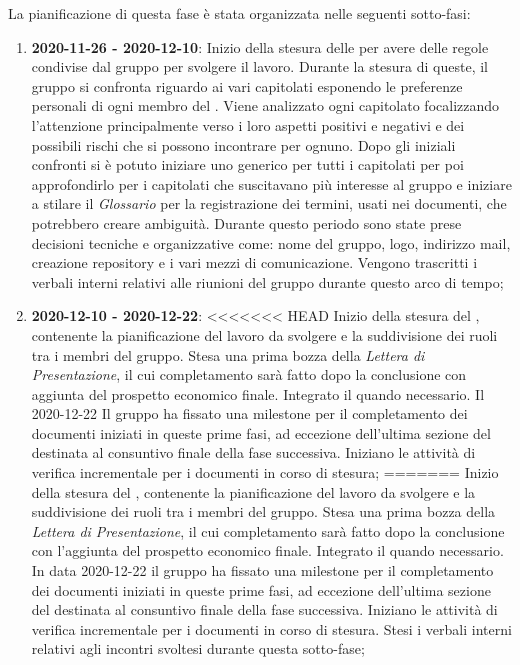 La pianificazione di questa fase è stata organizzata nelle seguenti sotto-fasi:
\begin{enumerate}
\item \textbf{2020-11-26 - 2020-12-10}:
Inizio della stesura delle \textit{\NdP} per avere delle regole condivise dal gruppo per svolgere il lavoro. Durante la stesura di queste, il gruppo si confronta riguardo ai vari capitolati esponendo le preferenze personali di ogni membro del . Viene analizzato ogni capitolato focalizzando l'attenzione principalmente verso i loro aspetti positivi e negativi e dei possibili rischi che si possono incontrare per ognuno. Dopo gli iniziali confronti si è potuto iniziare uno \textit{\SdF} generico per tutti i capitolati per poi approfondirlo per i capitolati che suscitavano più interesse al gruppo e iniziare a stilare il \textit{Glossario} per la registrazione dei termini, usati nei documenti, che potrebbero creare ambiguità. Durante questo periodo sono state prese decisioni tecniche e organizzative come: nome del gruppo, logo, indirizzo mail, creazione repository e i vari mezzi di comunicazione. Vengono trascritti i verbali interni relativi alle riunioni del gruppo durante questo arco di tempo;
\item \textbf{2020-12-10 - 2020-12-22}:
<<<<<<< HEAD
    Inizio della stesura del \PdP, contenente la pianificazione del lavoro da svolgere e la suddivisione dei ruoli tra i membri del gruppo.
    Stesa una prima bozza della \textit{Lettera di Presentazione}, il cui completamento sarà fatto dopo la conclusione \PdP con aggiunta del prospetto economico finale. Integrato il \Glossario quando necessario.
    Il 2020-12-22 Il gruppo ha fissato una milestone per il completamento dei documenti iniziati in queste prime fasi, ad eccezione dell'ultima sezione del \PdP destinata al consuntivo finale della fase successiva. Iniziano le attività di verifica incrementale per i documenti in corso di stesura;
=======
Inizio della stesura del \textit{\PdP}, contenente la pianificazione del lavoro da svolgere e la suddivisione dei ruoli tra i membri del gruppo. Stesa una prima bozza della \textit{Lettera di Presentazione}, il cui completamento sarà fatto dopo la conclusione \textit{\PdP} con l'aggiunta del prospetto economico finale. Integrato il \textit{\Glossario} quando necessario. In data 2020-12-22 il gruppo ha fissato una milestone per il completamento dei documenti iniziati in queste prime fasi, ad eccezione dell'ultima sezione del \textit{\PdP} destinata al consuntivo finale della fase successiva. Iniziano le attività di verifica incrementale per i documenti in corso di stesura. Stesi i verbali interni relativi agli incontri svoltesi durante questa sotto-fase;

\end{enumerate}
